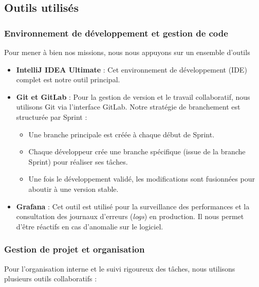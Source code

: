 \documentclass{article}
\begin{document}
\subsection{Outils utilisés}

\subsubsection{Environnement de développement et gestion de code}

Pour mener à bien nos missions, nous nous appuyons sur un ensemble d'outils

\begin{itemize}
    \item \textbf{IntelliJ IDEA Ultimate} : Cet environnement de développement (IDE) complet est notre outil principal.
    
    \item \textbf{Git et GitLab} : Pour la gestion de version et le travail collaboratif, nous utilisons Git via l'interface GitLab. Notre stratégie de branchement est structurée par Sprint :
    \begin{itemize}
        \item Une branche principale est créée à chaque début de Sprint.
        \item Chaque développeur crée une branche spécifique (issue de la branche Sprint) pour réaliser ses tâches.
        \item Une fois le développement validé, les modifications sont fusionnées pour aboutir à une version stable.
    \end{itemize}

    \item \textbf{Grafana} : Cet outil est utilisé pour la surveillance des performances et la consultation des journaux d'erreurs (\textit{logs}) en production. Il nous permet d'être réactifs en cas d'anomalie sur le logiciel.
\end{itemize}

\subsubsection{Gestion de projet et organisation}

Pour l'organisation interne et le suivi rigoureux des tâches, nous utilisons plusieurs outils collaboratifs :
\end{document}
